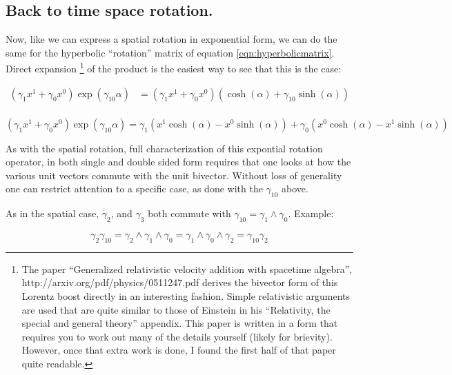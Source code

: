 \documentclass{article}      %
\begin{document}
\subsection{ Back to time space rotation. }

Now, like we can express a spatial rotation in exponential form, we can do the same for the hyperbolic ``rotation'' matrix of equation \ref{eqn:hyperbolicmatrix}.  Direct expansion
\footnote{
The paper ``Generalized relativistic velocity addition with spacetime algebra'', http://arxiv.org/pdf/physics/0511247.pdf derives the bivector form of this Lorentz boost directly in an interesting fashion.  Simple relativistic arguments are used that are quite similar to those of Einstein in his ``Relativity, the special and general theory'' appendix.  This paper is written in a form that requires you to work out many of the details yourself (likely for brievity).  However, once that extra work is done, I found the first half of that paper quite readable.
}
of the product is the easiest way to see that this is the case:

\begin{align*}
\left(\gamma_{1} x^1 + \gamma_{0} x^0 \right)\exp(\gamma_{10}\alpha)
&= \left(\gamma_{1} x^1 + \gamma_{0} x^0 \right) \left( \cosh(\alpha) +\gamma_{10}\sinh(\alpha) \right) \\
\end{align*}

\begin{equation}\label{eqn:lorentz}
\left(\gamma_{1} x^1 + \gamma_{0} x^0 \right)\exp(\gamma_{10}\alpha)
= \gamma_1\left( x^1 \cosh(\alpha) - x^0 \sinh(\alpha)\right) 
 + \gamma_0\left( x^0 \cosh(\alpha) - x^1 \sinh(\alpha)\right)
\end{equation}

As with the spatial rotation, full characterization of this expontial rotation operator, in both single and double sided form requires that one looks at how the various unit vectors commute with the unit bivector.  Without loss of generality one can restrict attention to a specific case, as done with the $\gamma_{10}$ above.

As in the spatial case, $\gamma_{2}$, and $\gamma_{3}$ both commute with $\gamma_{10} = \gamma_1 \wedge \gamma_0$.  Example:

\begin{equation*}
\gamma_{2} \gamma_{10}
= \gamma_2 \wedge \gamma_1 \wedge \gamma_0
= \gamma_1 \wedge \gamma_0 \wedge \gamma_2
= \gamma_{10} \gamma_{2}
\end{equation*}
\end{document}
